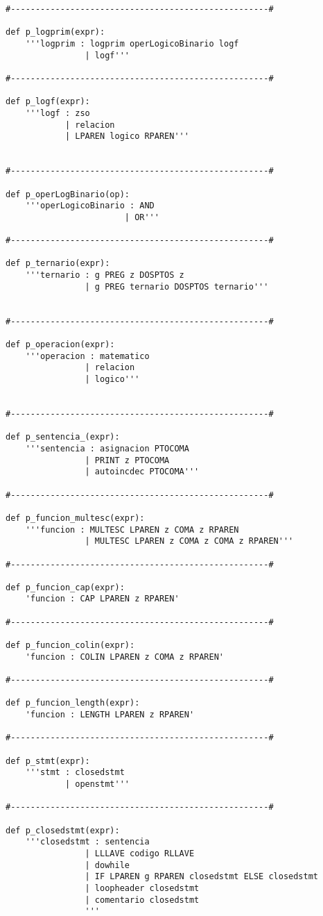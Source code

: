 \begin{verbatim}
#----------------------------------------------------#

def p_logprim(expr):
	'''logprim : logprim operLogicoBinario logf
				| logf'''

#----------------------------------------------------#

def p_logf(expr):
	'''logf : zso
			| relacion
			| LPAREN logico RPAREN'''


#----------------------------------------------------#

def p_operLogBinario(op):
	'''operLogicoBinario : AND
						| OR'''

#----------------------------------------------------#

def p_ternario(expr):
	'''ternario : g PREG z DOSPTOS z
				| g PREG ternario DOSPTOS ternario'''


#----------------------------------------------------#

def p_operacion(expr):
	'''operacion : matematico
				| relacion
				| logico'''


#----------------------------------------------------#

def p_sentencia_(expr):
	'''sentencia : asignacion PTOCOMA
				| PRINT z PTOCOMA
				| autoincdec PTOCOMA'''

#----------------------------------------------------#

def p_funcion_multesc(expr):
	'''funcion : MULTESC LPAREN z COMA z RPAREN
				| MULTESC LPAREN z COMA z COMA z RPAREN'''

#----------------------------------------------------#

def p_funcion_cap(expr):
	'funcion : CAP LPAREN z RPAREN'

#----------------------------------------------------#

def p_funcion_colin(expr):
	'funcion : COLIN LPAREN z COMA z RPAREN'

#----------------------------------------------------#

def p_funcion_length(expr):
	'funcion : LENGTH LPAREN z RPAREN'

#----------------------------------------------------#

def p_stmt(expr):
	'''stmt : closedstmt
			| openstmt'''

#----------------------------------------------------#

def p_closedstmt(expr):
	'''closedstmt : sentencia 
				| LLLAVE codigo RLLAVE
				| dowhile 
				| IF LPAREN g RPAREN closedstmt ELSE closedstmt
				| loopheader closedstmt
				| comentario closedstmt
				'''



\end{verbatim}
